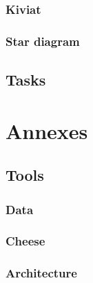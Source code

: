 \documentclass[8pt]{article} %
\begin{document}
\subsubsection{Kiviat}


\subsubsection{Star diagram}

\subsection{Tasks}

{\footnotesize

}

\section{Annexes}



\subsection{Tools}

{\footnotesize
\subsubsection{Data}

%
\subsubsection{Cheese}

\subsubsection{Architecture}
}
\end{document}
